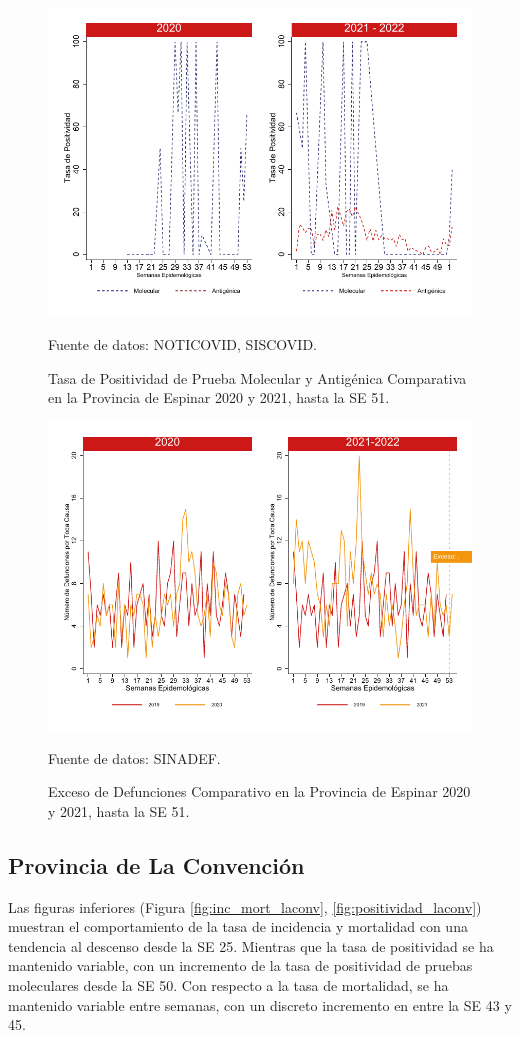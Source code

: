 \documentclass[12pt,a4paper,openany]{book}
\begin{document}
		\begin{figure}[h]
			\caption{Tasa de Positividad de Prueba Molecular y Antigénica Comparativa en la Provincia de Espinar 2020 y 2021, hasta la SE 51.}\label{fig:positividad_espinar}
			\begin{center}
				\includegraphics[width=0.7\linewidth]{../figuras/positividad_20_21_8}
			\end{center}
			{\footnotesize {Fuente de datos: NOTICOVID, SISCOVID.}}
		\end{figure}
		
		\begin{figure}[h]
			\caption{Exceso de Defunciones Comparativo en la Provincia de Espinar 2020 y 2021, hasta la SE 51.}\label{fig:exceso_espinar}
			\begin{center}
				\includegraphics[width=0.7\linewidth]{../figuras/exceso_8}
			\end{center}
			{\footnotesize {Fuente de datos: SINADEF.}}
		\end{figure}
		
		\clearpage
		
		\subsection*{Provincia de La Convención}
		\noindent Las figuras inferiores (Figura \ref{fig:inc_mort_laconv}, \ref{fig:positividad_laconv}) muestran el comportamiento de la tasa de incidencia y mortalidad con una tendencia al descenso desde la SE 25. Mientras que la tasa de positividad se ha mantenido variable, con un incremento de la tasa de positividad de pruebas moleculares desde la SE 50.
		Con respecto a la tasa de mortalidad, se ha mantenido variable entre semanas, con un discreto incremento en entre la SE 43 y 45. 
		
\end{document}
